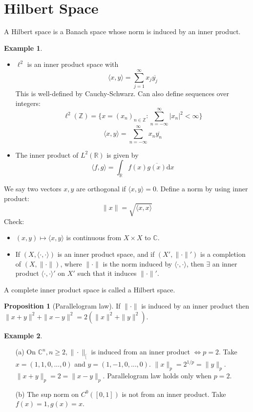 \documentclass{article}
\theoremstyle{definition}
\newtheorem{ex}{Example}
\newtheorem{prop}{Proposition}
\begin{document}
\section{Hilbert Space}

A Hilbert space is a Banach space whose norm is induced by an inner product.

\begin{ex}
	\begin{itemize}
		\item $\ell^2$ is an inner product space with
			\[
				\langle x, y \rangle = \sum_{j = 1}^\infty x_j \overline{y_j}
			\]
			This is well-defined by Cauchy-Schwarz.
			Can also define sequences over integers:
			\[
				\ell^2(\mathbb{Z}) = \{x = (x_n)_{n \in \mathbb{Z}}: \sum_{n = - \infty}^\infty |x_n|^2 < \infty\}
			\]
			\[
				\langle x, y \rangle = \sum_{n = -\infty}^\infty x_n \overline{y_n}
			\]
		\item The inner product of $L^2(\mathbb{R})$ is given by 
			\[
				\langle f, g \rangle = \int_{\mathbb{R}} f(x) \overline{g(x)} \mathrm{d} x
			\]
	\end{itemize}
\end{ex}

We say two vectors $x, y$ are orthogonal if $\langle x, y \rangle = 0$.
Define a norm by using inner product:
\[
	\|x\| = \sqrt{\langle x, x \rangle}
\]
Check:
\begin{itemize}
	\item $(x, y) \mapsto \langle x, y \rangle$ is continuous from $X \times X$ to $\mathbb{C}$.

	\item If $(X, \langle \cdot, \cdot \rangle)$ is an inner product space, and if $(X', \| \cdot \|')$ is a completion of $(X, \|\cdot \|)$, where $\| \cdot \|$ is the norm induced by $\langle \cdot, \cdot \rangle$, then $\exists$ an inner product $\langle \cdot, \cdot \rangle'$ on $X'$ such that it induces $\|\cdot \|'$.
\end{itemize}

A complete inner product space is called a Hilbert space.

\begin{prop}[Parallelogram law]
	If $\| \cdot \|$ is induced by an inner product then $\|x + y \|^2 + \|x - y\|^2 = 2(\|x\|^2 + \|y\|^2)$.
\end{prop}

\begin{ex}
	\begin{enumerate}
		\item[(a)] On $\mathbb{C}^n, n \geq 2, \| \cdot \|_[$ is induced from an inner product $\Leftrightarrow p = 2$.
			Take $x = (1, 1, 0, ..., 0)$ and $y = (1, -1, 0, ..., 0)$.
			$\|x\|_p = 2^{1/p} = \|y\|_p$.
			$\|x + y \|_p = 2 = \|x - y\|_p$.
			Parallelogram law holds only when $p = 2$.
			
		\item[(b)] The sup norm on $C^0([0, 1])$ is not from an inner product.
			Take $f(x) = 1, g(x) = x$.
	\end{enumerate}
\end{ex}
\end{document}
